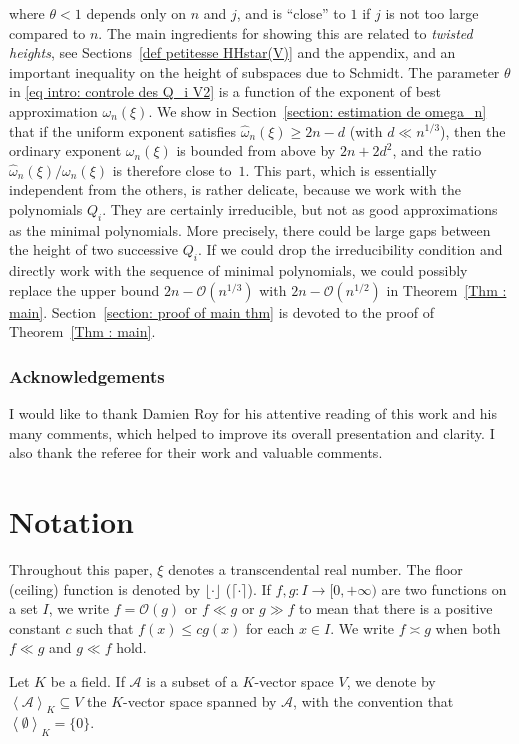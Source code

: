 \documentclass[JEP,XML,SOM,Unicode,NoFloatCountersInSection,published]{cedram}
\newcommand\cA{\mathcal{A}}
\newcommand\GrO{\mathcal{O}}
\newcommand\homega{\widehat{\omega}}\newcommand\HH{\mathcal{H}}
\newcommand{\Vect}[2][]{\left\la #2\right\ra_{#1}}
\let\subset \subseteq
\let\la\langle
\let\ra\rangle
\theoremstyle{definition}
\theoremstyle{plain}
\begin{document}
where $\theta < 1$ depends only on $n$ and $j$, and is ``close'' to $1$ if $j$ is not too large compared to $n$. The main ingredients for showing this are related to \emph{twisted heights}, see Sections~\ref{def petitesse HHstar(V)} and the appendix, and an important inequality on the height of subspaces due to Schmidt. The parameter $\theta$ in \eqref{eq intro: controle des Q_i V2} is a function of the exponent of best approximation $\omega_n(\xi)$. We show in Section~\ref{section: estimation de omega_n} that if the uniform exponent satisfies $\homega_n(\xi) \geq 2n-d$ (with $d \ll n^{1/3}$), then the ordinary exponent $\omega_n(\xi)$ is bounded from above by $2n+2d^2$, and the ratio $\homega_n(\xi)/\omega_n(\xi)$ is therefore close to~$1$. This part, which is essentially independent from the others, is rather delicate, because we work with the polynomials $Q_i$. They are certainly irreducible, but not as good approximations as the minimal polynomials. More precisely, there could be large gaps between the height of two successive $Q_i$. If we could drop the irreducibility condition and directly work with the sequence of minimal polynomials, we could possibly replace the upper bound $2n- \GrO(n^{1/3})$ with $2n- \GrO(n^{1/2})$ in Theorem~\ref{Thm : main}. Section~\ref{section: proof of main thm} is devoted to the proof of Theorem~\ref{Thm : main}.

\subsubsection*{Acknowledgements}
I would like to thank Damien Roy for his attentive reading of this work and his many comments, which helped to improve its overall presentation and clarity. I also thank the referee for their work and valuable comments.

\section{Notation}
\label{section: notation}
Throughout this paper, $\xi$ denotes a transcendental real number. The floor (\resp ceiling) function is denoted by $\lfloor \cdot \rfloor$ (\resp $\lceil \cdot \rceil$). If $f, g : I \to [0, +\infty)$ are two functions on a set $I$, we write $f = \GrO(g)$ or $f \ll g$ or $g \gg f$ to mean that there is a positive constant $c$ such that $f (x) \leq cg(x)$ for each $x\in I$. We write $f \asymp g$ when both $f \ll g$ and $g \ll f$ hold.

Let $K$ be a field. If $\cA$ is a subset of a $K$-vector space $V$, we denote by $\Vect[K]{\cA} \subset V$ the $K$-vector space spanned by $\cA$, with the convention that $\Vect[K]{\emptyset} = \{0\}$.
\end{document}

